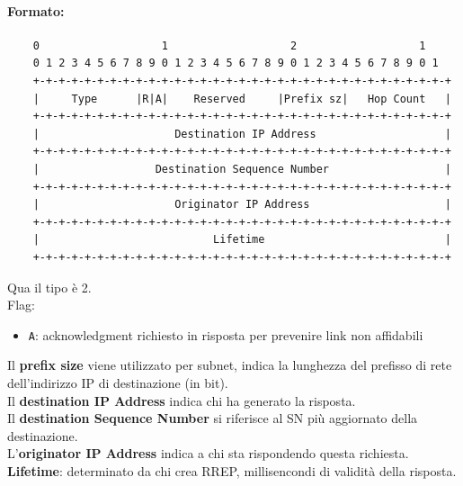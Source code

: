 \paragraph{Formato:} 
\begin{verbatim}
	0                   1                   2                   1
	0 1 2 3 4 5 6 7 8 9 0 1 2 3 4 5 6 7 8 9 0 1 2 3 4 5 6 7 8 9 0 1
	+-+-+-+-+-+-+-+-+-+-+-+-+-+-+-+-+-+-+-+-+-+-+-+-+-+-+-+-+-+-+-+-+
	|     Type      |R|A|    Reserved     |Prefix sz|   Hop Count   |
	+-+-+-+-+-+-+-+-+-+-+-+-+-+-+-+-+-+-+-+-+-+-+-+-+-+-+-+-+-+-+-+-+
	|                     Destination IP Address                    |
	+-+-+-+-+-+-+-+-+-+-+-+-+-+-+-+-+-+-+-+-+-+-+-+-+-+-+-+-+-+-+-+-+
	|                  Destination Sequence Number                  |
	+-+-+-+-+-+-+-+-+-+-+-+-+-+-+-+-+-+-+-+-+-+-+-+-+-+-+-+-+-+-+-+-+
	|                     Originator IP Address                     |
	+-+-+-+-+-+-+-+-+-+-+-+-+-+-+-+-+-+-+-+-+-+-+-+-+-+-+-+-+-+-+-+-+
	|                           Lifetime                            |
	+-+-+-+-+-+-+-+-+-+-+-+-+-+-+-+-+-+-+-+-+-+-+-+-+-+-+-+-+-+-+-+-+
\end{verbatim}

Qua il tipo è 2.\\

Flag:
\begin{itemize}
	\item \texttt{A}: acknowledgment richiesto in risposta per prevenire link non affidabili
\end{itemize} 

Il \textbf{prefix size} viene utilizzato per subnet, indica la lunghezza del prefisso di rete dell'indirizzo IP di destinazione (in bit).\\

Il \textbf{destination IP Address} indica chi ha generato la risposta.\\

Il \textbf{destination Sequence Number} si riferisce al SN più aggiornato della destinazione.\\

L'\textbf{originator IP Address} indica a chi sta rispondendo questa richiesta.\\

\textbf{Lifetime}: determinato da chi crea RREP, millisencondi di validità della risposta.\\

